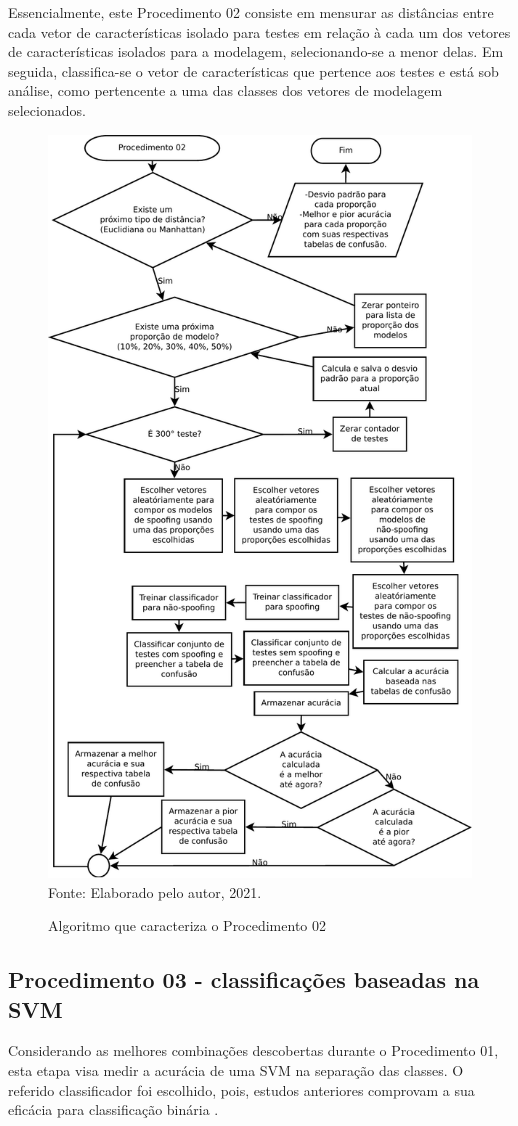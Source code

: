 		\par Essencialmente, este Procedimento 02 consiste em mensurar as distâncias entre cada vetor de características isolado para testes em relação à cada um dos vetores de características isolados para a modelagem, selecionando-se a menor delas. Em seguida, classifica-se o vetor de características que pertence aos testes e está sob análise, como pertencente a uma das classes dos vetores de modelagem selecionados.   

		\begin{figure}[H]
			\centering
			\caption{Algoritmo que caracteriza o Procedimento 02}
			\includegraphics[width=.75\linewidth]{images/AlgoProcedure02}
			\label{fig:experiment02Algo}
			\\Fonte: Elaborado pelo autor, 2021.
		\end{figure}
		
		

		\subsection{Procedimento 03 - classificações baseadas na SVM}
		\label{chap:propApproach:sec:Experimento03}
		\par Considerando as melhores combinações descobertas durante o Procedimento 01, esta etapa visa medir a acurácia de uma SVM na separação das classes. O referido classificador foi escolhido, pois, estudos anteriores comprovam a sua eficácia para classificação binária \cite{bennett2000support}. \\
		
